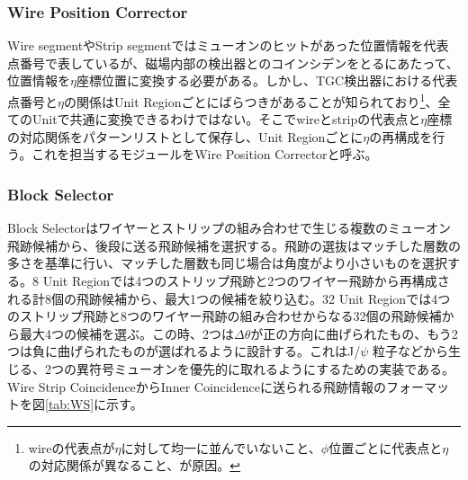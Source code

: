 \subsubsection*{Wire Position Corrector}
Wire segmentやStrip segmentではミューオンのヒットがあった位置情報を代表点番号で表しているが、磁場内部の検出器とのコインシデンをとるにあたって、位置情報を$\eta$座標位置に変換する必要がある。しかし、TGC検出器における代表点番号と$\eta$の関係はUnit Regionごとにばらつきがあることが知られており\footnote{wireの代表点が$\eta$に対して均一に並んでいないこと、$\phi$位置ごとに代表点と$\eta$の対応関係が異なること、が原因。}、全てのUnitで共通に変換できるわけではない。そこでwireとstripの代表点と$\eta$座標の対応関係をパターンリストとして保存し、Unit Regionごとに$\eta$の再構成を行う。これを担当するモジュールをWire Position Correctorと呼ぶ。

\subsubsection*{Block Selector}
Block Selectorはワイヤーとストリップの組み合わせで生じる複数のミューオン飛跡候補から、後段に送る飛跡候補を選択する。飛跡の選抜はマッチした層数の多さを基準に行い、マッチした層数も同じ場合は角度がより小さいものを選択する。8 Unit Regionでは4つのストリップ飛跡と2つのワイヤー飛跡から再構成される計8個の飛跡候補から、最大1つの候補を絞り込む。32 Unit Regionでは4つのストリップ飛跡と8つのワイヤー飛跡の組み合わせからなる32個の飛跡候補から最大4つの候補を選ぶ。この時、2つは$\Delta\theta$が正の方向に曲げられたもの、もう2つは負に曲げられたものが選ばれるように設計する。これはJ/$\psi$ 粒子などから生じる、2つの異符号ミューオンを優先的に取れるようにするための実装である。
Wire Strip CoincidenceからInner Coincidenceに送られる飛跡情報のフォーマットを図\ref{tab:WS}に示す。

